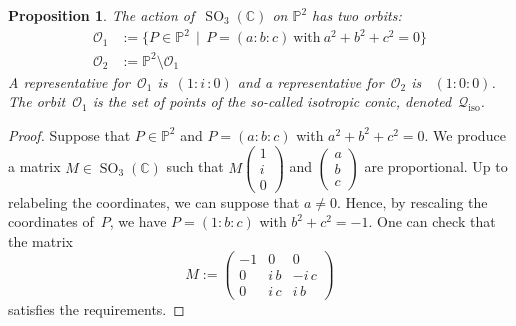 \documentclass[a4paper, 11pt, reqno]{amsart}
\theoremstyle{plain}
\newtheorem{prop}[lemma]{Proposition}
\theoremstyle{definition}
\newcommand{\C}{\mathbb{C}}
\newcommand{\p}{\mathbb{P}}
\newcommand{\iii}{\textit{i}\,}
\newcommand{\iso}{\mathcal{Q}_{\mathrm{iso}}}
\newcommand{\SO}{\operatorname{SO}}
\begin{document}
\begin{prop}
\label{two_orbits}
The action of~$\SO_3(\C)$ on $\p^2$ has two orbits:
%
\begin{align*}
  \mathcal{O}_1 &:=
  \bigl\{
    P \in \p^2 \, \mid \,
    P = (a:b:c) \ \text{with} \ a^2 + b^2 + c^2 = 0
  \bigr\} \\
  \mathcal{O}_2 &:= \p^2 \setminus \mathcal{O}_1
\end{align*}
%
A representative for~$\mathcal{O}_1$ is~$(1:\iii:0)$ and a
representative for~$\mathcal{O}_2$ is~ $(1:0:0)$.
The orbit~$\mathcal{O}_1$ is the set of points of the so-called \emph{isotropic conic}, denoted~$\iso$.
\end{prop}
\begin{proof}
Suppose that $P \in \p^2$ and $P = (a:b:c)$ with $a^2 + b^2 + c^2 = 0$.
We produce a matrix $M \in \SO_3(\C)$ such that $M \left(\begin{smallmatrix} 1 \\ \iii \\ 0 \end{smallmatrix}\right)$ and $\left(\begin{smallmatrix} a \\ b \\ c \end{smallmatrix}\right)$ are proportional.
Up to relabeling the coordinates, we can suppose that $a \neq 0$.
Hence, by rescaling the coordinates of~$P$, we have $P = (1: b: c)$ with $b^2 + c^2 = -1$.
One can check that the matrix
%
\[
  M :=
  \begin{pmatrix}
    -1 & 0 & 0 \\
    0 & \iii b & -\iii c \\
    0 & \iii c & \iii b
  \end{pmatrix}
\]
%
satisfies the requirements.


\end{proof}
\end{document}
